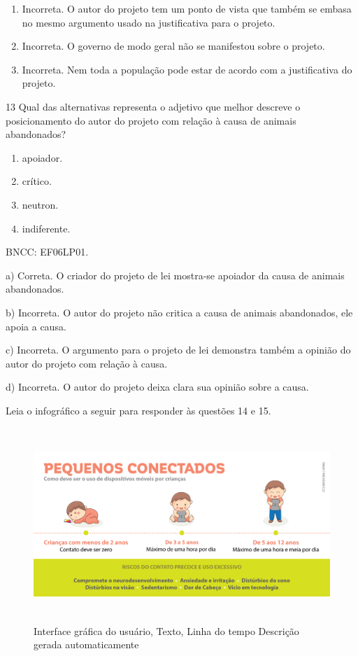 {\begin{enumerate}
\def\labelenumi{\alph{enumi})}
\setcounter{enumi}{1}
\item
  Incorreta. O autor do projeto tem um ponto de vista que também se
  embasa no mesmo argumento usado na justificativa para o projeto.
\item
  Incorreta. O governo de modo geral não se manifestou sobre o projeto.
\item
  Incorreta. Nem toda a população pode estar de acordo com a
  justificativa do projeto.
\end{enumerate}

\num{13} Qual das alternativas representa o adjetivo que melhor descreve
o posicionamento do autor do projeto com relação à causa de animais
abandonados?

\begin{enumerate}
\def\labelenumi{\alph{enumi})}
\item
  apoiador.
\item
  crítico.
\item
  neutron.
\item
  indiferente.
\end{enumerate}

BNCC: EF06LP01.

a) Correta. O criador do projeto de lei mostra-se apoiador da causa de
animais abandonados.

b) Incorreta. O autor do projeto não critica a causa de animais
abandonados, ele apoia a causa.

c) Incorreta. O argumento para o projeto de lei demonstra também a
opinião do autor do projeto com relação à causa.

d) Incorreta. O autor do projeto deixa clara sua opinião sobre a causa.

Leia o infográfico a seguir para responder às questões 14 e 15.

\begin{figure}
\centering
\includegraphics[width=5.90556in,height=2.88125in]{./imgSAEB_6_POR/media/image46.png}
\caption{Interface gráfica do usuário, Texto, Linha do tempo Descrição
gerada automaticamente}
\end{figure}

}
